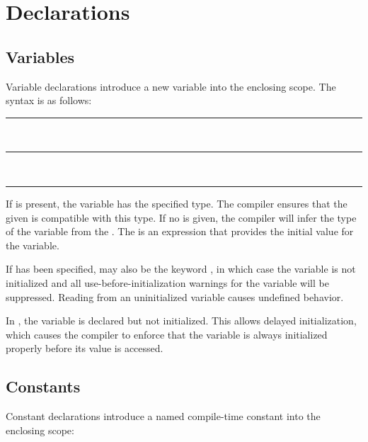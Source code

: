
\chapter{Declarations}

\section{Variables}

Variable declarations introduce a new variable into the enclosing scope. The
syntax is as follows:

\begin{grammar}
\rule{implicitly-typed-variable-definition}   \code{=}  \code{;}\\
\rule{explicitly-typed-variable-definition}   \code{=}  \code{;}\\
\rule{variable-declaration}   \code{;}
\end{grammar}

If  is present, the variable has the specified type. The
compiler ensures that the given  is compatible with
this type. If no  is given, the compiler will infer the type
of the variable from the . The
 is an expression that provides the initial value for
the variable.

If  has been specified,  may also be
the keyword , in which case the variable is not initialized and
all use-before-initialization warnings for the variable will be suppressed.
Reading from an uninitialized variable causes undefined behavior.

In , the variable is declared but not
initialized. This allows delayed initialization, which causes the compiler to
enforce that the variable is always initialized properly before its value is
accessed.

\section{Constants}

Constant declarations introduce a named compile-time constant into the enclosing
scope:

